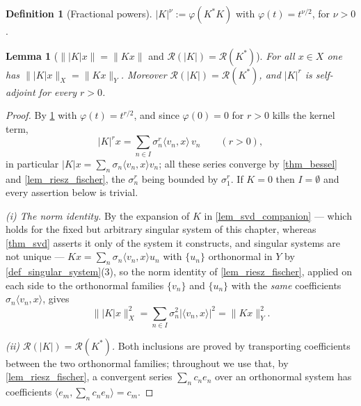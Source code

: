 \documentclass[a4paper]{report}
\theoremstyle{plain}
\newtheorem{lemma}[theorem]{Lemma}
\theoremstyle{definition}
\newtheorem{definition}[theorem]{Definition}
\theoremstyle{remark}
\begin{document}
\begin{definition}[Fractional powers]
  \label{def_frac_power}
  $|K|^\nu := \varphi(K^*K)$ with $\varphi(t) = t^{\nu/2}$, for $\nu > 0$.
\end{definition}


\begin{lemma}[$\||K|x\| = \|Kx\|$ and $\mathcal{R}(|K|) = \mathcal{R}(K^*)$]
  \label{lem_abs_norm}
  For all $x \in X$ one has $\||K|x\|_X = \|Kx\|_Y$.  Moreover
  $\mathcal{R}(|K|) = \mathcal{R}(K^*)$, and $|K|^r$ is self-adjoint for every $r > 0$.
\end{lemma}
\begin{proof}
  By \cref{def_frac_power} with $\varphi(t) = t^{r/2}$, and since $\varphi(0) = 0$ for
  $r > 0$ kills the kernel term,
  \[
    |K|^rx = \sum_{n\in I}\sigma_n^r\langle v_n,x\rangle\,v_n \qquad (r>0),
  \]
  in particular $|K|x = \sum_n\sigma_n\langle v_n,x\rangle v_n$; all these series converge
  by \cref{thm_bessel} and \cref{lem_riesz_fischer}, the $\sigma_n^r$ being bounded by
  $\sigma_1^r$.  If $K = 0$ then $I = \emptyset$ and every assertion below is trivial.

  \emph{(i) The norm identity.}  By the expansion of $K$ in \cref{lem_svd_companion} ---
  which holds for the fixed but arbitrary singular system of this chapter, whereas
  \cref{thm_svd} asserts it only of the system it constructs, and singular systems are not
  unique --- $Kx = \sum_n\sigma_n\langle v_n,x\rangle u_n$ with $\{u_n\}$ orthonormal in
  $Y$ by \cref{def_singular_system}(3), so the
  norm identity of \cref{lem_riesz_fischer}, applied on each side to the orthonormal
  families $\{v_n\}$ and $\{u_n\}$ with the \emph{same} coefficients
  $\sigma_n\langle v_n,x\rangle$, gives
  \[
    \bigl\||K|x\bigr\|_X^2 = \sum_{n\in I}\sigma_n^2|\langle v_n,x\rangle|^2
      = \|Kx\|_Y^2 .
  \]

  \emph{(ii) $\mathcal{R}(|K|) = \mathcal{R}(K^*)$.}  Both inclusions are proved by
  transporting coefficients between the two orthonormal families; throughout we use that,
  by \cref{lem_riesz_fischer}, a convergent series $\sum_n c_ne_n$ over an orthonormal
  system has coefficients $\langle e_m, \sum_n c_ne_n\rangle = c_m$.


\end{proof}
\end{document}
